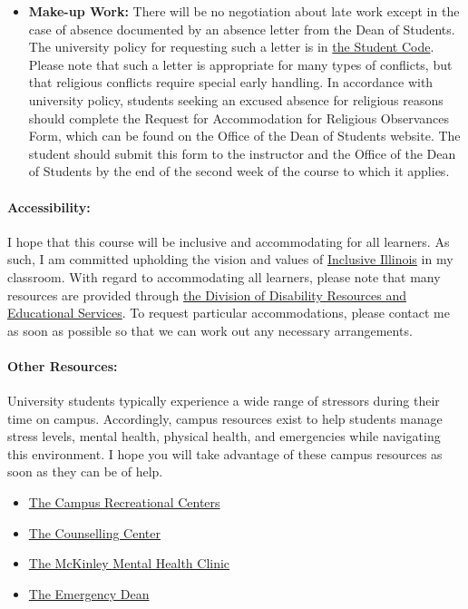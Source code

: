 \documentclass[11pt, a4paper]{article}
\begin{document}
\begin{itemize}
\item[] \textbf{Make-up Work:} There will be no negotiation about late work except in the case of absence documented by an absence letter from the Dean of Students.  The university policy for requesting such a letter is in \href{http://studentcode.illinois.edu/article1_part5_1-501.html}{the Student Code}. Please note that such a letter is appropriate for many types of conflicts, but that religious conflicts require special early handling. In accordance with university policy, students seeking an excused absence for religious reasons should complete the Request for Accommodation for Religious Observances Form, which can be found on the Office of the Dean of Students website. The student should submit this form to the instructor and the Office of the Dean of Students by the end of the second week of the course to which it applies.

\end{itemize}

\paragraph{Accessibility:} I hope that this course will be inclusive and
accommodating for all learners. As such, I am committed upholding the vision
and values of \href{http://www.inclusiveillinois.illinois.edu/index.html}{Inclusive Illinois}
in my
classroom.  With regard to accommodating all learners, please note that many
resources are provided through
\href{http://disability.illinois.edu/academic-support/accommodations}{the
Division of Disability Resources and Educational Services}.  To request
particular accommodations, please contact me as soon as possible so that we can
work out any necessary arrangements.

\paragraph{Other Resources:}
University students typically experience a wide range of stressors during their
time on campus. Accordingly, campus resources exist to help students manage
stress levels, mental health, physical health, and emergencies while navigating
this environment. I hope you will take advantage of these campus resources as
soon as they can be of help.

\begin{itemize}
\item \href{https://campusrec.illinois.edu/}{The Campus Recreational Centers}
\item \href{http://counselingcenter.illinois.edu/}{The Counselling Center}
\item \href{http://www.mckinley.illinois.edu/clinics/mental\_health.htm}{The McKinley Mental Health Clinic}
\item \href{http://odos.illinois.edu/emergency/}{The Emergency Dean}
\end{itemize}
\end{document}
